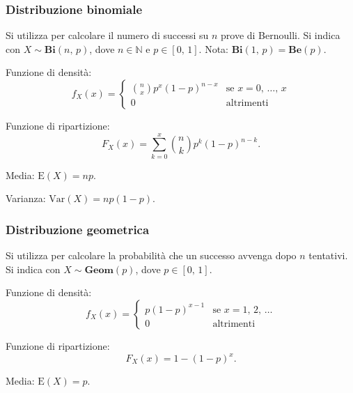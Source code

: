 \documentclass{article}
\theoremstyle{definition}
\newcommand{\N}{\mathbb{N}}
\newcommand{\E}{\text{E}}
\newcommand{\Var}{\text{Var}}
\begin{document}
            \subsubsection{Distribuzione binomiale}

                Si utilizza per calcolare il numero di successi su \(n\) prove di Bernoulli. Si indica con \(X \sim \mathbf{Bi}(n, \, p)\),
                dove \(n \in \N\) e \(p \in [0, \, 1]\). Nota: \(\mathbf{Bi}(1, \, p) = \mathbf{Be}(p)\).

                Funzione di densità:
                \[
                    f_X (x) =
                        \begin{cases}
                            \binom{n}{x} p^x {(1-p)}^{n - x} & \text{se } x = 0, \, \ldots, \, x\\
                            0 & \text{altrimenti}
                        \end{cases}
                \]

                Funzione di ripartizione:
                \[
                    F_X (x) = \sum_{k = 0}^x \binom{n}{k} p^k {(1-p)}^{n - k}.
                \]

                Media: \(\E(X) = np\).

                Varianza: \(\Var(X) = np(1-p)\).

            \subsubsection{Distribuzione geometrica}

                Si utilizza per calcolare la probabilità che un successo avvenga dopo \(n\) tentativi. Si indica con \(X \sim \mathbf{Geom}(p)\),
                dove \(p \in [0, \, 1]\).

                Funzione di densità:
                \[
                    f_X (x) =
                        \begin{cases}
                            p {(1-p)}^{x-1} & \text{se } x = 1, \, 2, \, \ldots\\
                            0 & \text{altrimenti}
                        \end{cases}
                \]

                Funzione di ripartizione:
                \[
                    F_X (x) = 1 - {(1-p)}^x.
                \]

                Media: \(\E (X) = p\).
\end{document}
